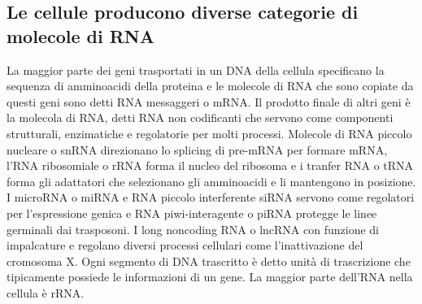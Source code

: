 \subsection{Le cellule producono diverse categorie di molecole di RNA}
La maggior parte dei geni trasportati in un DNA della cellula specificano la sequenza di amminoacidi della proteina e le molecole di RNA che sono copiate da questi geni sono detti RNA
messaggeri o mRNA. Il prodotto finale di altri geni \`e la molecola di RNA, detti RNA non codificanti che servono come componenti strutturali, enzimatiche e regolatorie per molti 
processi. Molecole di RNA piccolo nucleare o snRNA direzionano lo splicing di pre-mRNA per formare mRNA, l'RNA ribosomiale o rRNA forma il nucleo del ribosoma e i tranfer RNA o tRNA
forma gli adattatori che selezionano gli amminoacidi e li mantengono in posizione. I microRNA o miRNA e RNA piccolo interferente siRNA servono come regolatori per l'espressione genica e 
RNA piwi-interagente o piRNA protegge le linee germinali dai trasposoni. I long noncoding RNA o lncRNA con funzione di impalcature e regolano diversi processi cellulari come
l'inattivazione del cromosoma X. Ogni segmento di DNA trascritto \`e detto unit\`a di trascrizione che tipicamente possiede le informazioni di un gene. La maggior parte dell'RNA nella
cellula \`e rRNA.
